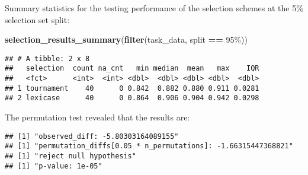 \documentclass[
]{book}
\newenvironment{Shaded}{\begin{snugshade}}{\end{snugshade}}
\newcommand{\AttributeTok}[1]{\textcolor[rgb]{0.13,0.29,0.53}{#1}}
\newcommand{\DecValTok}[1]{\textcolor[rgb]{0.00,0.00,0.81}{#1}}
\newcommand{\FunctionTok}[1]{\textcolor[rgb]{0.13,0.29,0.53}{\textbf{#1}}}
\newcommand{\NormalTok}[1]{#1}
\newcommand{\OtherTok}[1]{\textcolor[rgb]{0.56,0.35,0.01}{#1}}
\newcommand{\SpecialCharTok}[1]{\textcolor[rgb]{0.81,0.36,0.00}{\textbf{#1}}}
\newcommand{\StringTok}[1]{\textcolor[rgb]{0.31,0.60,0.02}{#1}}
\begin{document}
Summary statistics for the testing performance of the selection schemes at the 5\% selection set split:

\begin{Shaded}
\begin{Highlighting}[]
\FunctionTok{selection\_results\_summary}\NormalTok{(}\FunctionTok{filter}\NormalTok{(task\_data, split }\SpecialCharTok{==} \StringTok{\textquotesingle{}95\%\textquotesingle{}}\NormalTok{))}
\end{Highlighting}
\end{Shaded}

\begin{verbatim}
## # A tibble: 2 x 8
##   selection  count na_cnt   min median  mean   max    IQR
##   <fct>      <int>  <int> <dbl>  <dbl> <dbl> <dbl>  <dbl>
## 1 tournament    40      0 0.842  0.882 0.880 0.911 0.0281
## 2 lexicase      40      0 0.864  0.906 0.904 0.942 0.0298
\end{verbatim}

The permutation test revealed that the results are:

\begin{Shaded}
\end{Shaded}

\begin{verbatim}
## [1] "observed_diff: -5.80303164089155"
## [1] "permutation_diffs[0.05 * n_permutations]: -1.66315447368821"
## [1] "reject null hypothesis"
## [1] "p-value: 1e-05"
\end{verbatim}
\end{document}
